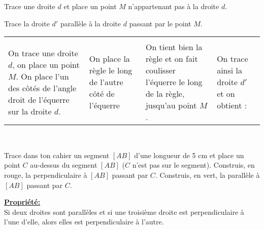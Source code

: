 \begin{methode*1}

\begin{exemple*1}
Trace une droite $d$ et place un point $M$ n'appartenant pas à la droite $d$.

Trace la droite $d'$ parallèle à la droite $d$ passant par le point $M$. \\[0.75em]

\begin{tabularx}{1.15\textwidth}{X|X|X|X}
  &   &  &  \\ 
On trace une droite $d$, on place un point $M$. On place l'un des côtés de l'angle droit de l'équerre sur la droite $d$. & On place la règle le long de l'autre côté de l'équerre & On tient bien la règle et on fait coulisser l'équerre le long de la règle, jusqu'au point $M$. & On trace ainsi la droite $d'$ et on obtient :\vspace{0.3em}
\\
\end{tabularx} \\
 \end{exemple*1}

\exercice

Trace dans ton cahier un segment $[AB]$ d'une longueur de 5 cm et place un point $C$ au-dessus du segment $[AB]$ ($C$ n'est pas sur le segment). Construis, en rouge, la perpendiculaire à $[AB]$ passant par $C$. Construis, en vert, la parallèle à $[AB]$ passant par $C$.

\end{methode*1}

\begin{aconnaitre}
\textbf{\underline{Propriété:}}\\
Si deux droites sont parallèles et si une troisième droite est perpendiculaire à l'une d'elle, alors elles est perpendiculaire à l'autre.
\end{aconnaitre}

